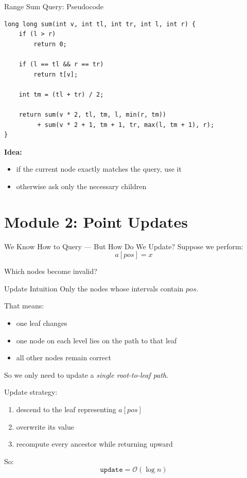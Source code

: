 \documentclass[aspectratio=169]{beamer}
\begin{document}
\begin{frame}[fragile]{Range Sum Query: Pseudocode}
\scriptsize
\begin{verbatim}
long long sum(int v, int tl, int tr, int l, int r) {
    if (l > r)
        return 0;

    if (l == tl && r == tr)
        return t[v];

    int tm = (tl + tr) / 2;

    return sum(v * 2, tl, tm, l, min(r, tm))
         + sum(v * 2 + 1, tm + 1, tr, max(l, tm + 1), r);
}
\end{verbatim}

    \normalsize
    \textbf{Idea:}
    \begin{itemize}
        \item if the current node exactly matches the query, use it
        \item otherwise ask only the necessary children
    \end{itemize}
\end{frame}


\section{Module 2: Point Updates}

\begin{frame}{We Know How to Query --- But How Do We Update?}
    Suppose we perform:
    $$
    a[pos] = x
    $$

    Which nodes become invalid?
\end{frame}

\begin{frame}{Update Intuition}
    Only the nodes whose intervals contain \(pos\).

    That means:
    \begin{itemize}
        \item one leaf changes
        \item one node on each level lies on the path to that leaf
        \item all other nodes remain correct
    \end{itemize}

    So we only need to update a \textit{single root-to-leaf path}.

    Update strategy:
    \begin{enumerate}
        \item descend to the leaf representing \(a[pos]\)
        \item overwrite its value
        \item recompute every ancestor while returning upward
    \end{enumerate}

    So:
    $$
    \texttt{update} = \mathcal{O}(\log n)
    $$
\end{frame}
\end{document}
